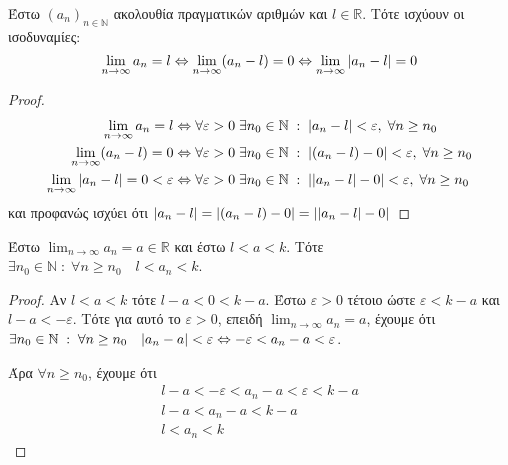 \documentclass[a4paper,table]{report}
\begin{document}
\begin{mybox3}
  \begin{prop}
    Έστω $ (a_{n})_{n \in \mathbb{N}} $ ακολουθία πραγματικών αριθμών και 
    $ l \in \mathbb{R} $. Τότε ισχύουν οι ισοδυναμίες:
    \[ \lim_{n \to \infty} a_{n} = l \Leftrightarrow \lim_{n \to \infty} (
      a_{n}- l) = 0 
    \Leftrightarrow \lim_{n \to \infty} \abs{a_{n}-l} = 0\]
  \end{prop}
\end{mybox3}
\begin{proof}
\item {}
  \begin{align*} 
    \lim_{n \to \infty} a_{n}= l & \Leftrightarrow \forall 
    \varepsilon > 0 \; \exists n_{0} \in \mathbb{N} \; : \; 
    \abs{a_{n}-l} < \varepsilon, \; \forall n \geq n_{0} \\ 
    \lim_{n \to \infty} (a_{n}-l) = 0 & \Leftrightarrow \forall 
    \varepsilon >0 \; \exists n_{0} \in \mathbb{N} \; : \; 
    \abs {(a_{n}-l) - 0} < \varepsilon , \; \forall n \geq n_{0} \\
    \lim_{n \to \infty} \abs{a_{n}-l}=0 < \varepsilon & \Leftrightarrow 
    \forall \varepsilon > 0 \; \exists n_{0} \in \mathbb{N} 
    \; : \; \abs {\abs{a_{n}- l } - 0} < \varepsilon, \; \forall n \geq 
    n_{0} 
  \end{align*}
  και προφανώς ισχύει ότι 
  $ \abs{a_{n}-l} = \abs{(a_{n}-l)-0} = \abs{\abs{a_{n}- l} -0} $
\end{proof}

\begin{mybox3}
  \begin{prop}
    Έστω $ \lim_{n \to \infty} a_{n}=a \in \mathbb{R} $ και έστω $ l<a<k $. Τότε 
    $ \exists n_{0} \in \mathbb{N} \; : \; \forall n \geq n_{0} \quad l < a_{n} < k $.
  \end{prop}
\end{mybox3}
\begin{proof}
  Αν $ l<a<k $ τότε $l-a<0<k-a $.
  Έστω $ \varepsilon >0 $ τέτοιο ώστε $ \varepsilon < k-a $ και $ l-a < - 
  \varepsilon $. Τότε για αυτό το $ \varepsilon >0 $, επειδή $ \lim_{n \to \infty}
  a_{n}=a $, έχουμε ότι $ \exists n_{0} \in \mathbb{N} \; : \; \forall n \geq n_{0}
  \quad \abs{a_{n}- a} < \varepsilon \Leftrightarrow - \varepsilon < a_{n}-a <
  \varepsilon $. 

  Άρα $ \forall n \geq n_{0} $, έχουμε ότι
  \begin{gather*}
    l-a < -\varepsilon < a_{n}-a < \varepsilon < k-a \\
    l-a < a_{n}- a< k-a \\
    l < a_{n} < k
  \end{gather*} 
\end{proof}
\end{document}
